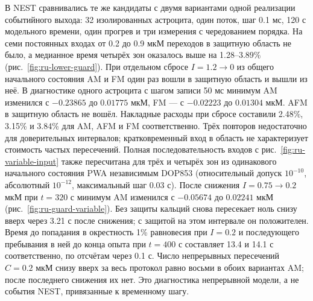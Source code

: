 В NEST сравнивались те же кандидаты с двумя вариантами одной реализации событийного выхода: 32 изолированных астроцита, один поток, шаг 0.1 мс, 120 с модельного времени, один прогрев и три измерения с чередованием порядка. На семи постоянных входах от 0.2 до 0.9 мкМ переходов в защитную область не было, а медианное время четырёх зон оказалось выше на 1.28--3.89\% (рис.~\ref{fig:ru-lower-guard}). При отдельном сбросе $I=1.2\to0$ из общего начального состояния AM и FM один раз вошли в защитную область и вышли из неё. В диагностике одного астроцита с шагом записи 50 мс минимум AM изменился с $-0.23865$ до $0.01775$ мкМ, FM --- с $-0.02223$ до $0.01304$ мкМ. AFM в защитную область не вошёл. Накладные расходы при сбросе составили 2.48\%, 3.15\% и 3.84\% для AM, AFM и FM соответственно. Трёх повторов недостаточно для доверительных интервалов; кратковременный вход в область не характеризует стоимость частых пересечений.
Полная последовательность входов с рис.~\ref{fig:ru-variable-input} также пересчитана для трёх и четырёх зон из одинакового начального состояния PWA независимым DOP853 (относительный допуск $10^{-10}$, абсолютный $10^{-12}$, максимальный шаг 0.03 с). После снижения $I=0.75\to0.2$ мкМ при $t=320$ с минимум AM изменился с $-0.05674$ до $0.02241$ мкМ (рис.~\ref{fig:ru-guard-variable}). Без защиты кальций снова пересекает ноль снизу вверх через 3.21 с после снижения; с защитой на этом интервале он положителен. Время до попадания в окрестность 1\% равновесия при $I=0.2$ и последующего пребывания в ней до конца опыта при $t=400$ с составляет 13.4 и 14.1 с соответственно, по отсчётам через 0.1 с. Число непрерывных пересечений $C=0.2$ мкМ снизу вверх за весь протокол равно восьми в обоих вариантах AM; после последнего снижения их нет. Это диагностика непрерывной модели, а не события NEST, привязанные к временному шагу.


